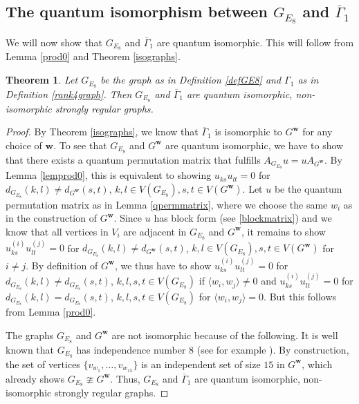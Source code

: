 \documentclass[11pt]{article}
\newtheorem{theo}{Theorem}[section]
\theoremstyle{definition}
\numberwithin{equation}{section}
\begin{document}
\subsection[The quantum isomorphism]{The quantum isomorphism between \texorpdfstring{$G_{E_8}$}{G E8} and \texorpdfstring{$\overline{\Gamma}_1$}{the complement of Gamma 1}}

We will now show that $G_{E_8}$ and $\overline{\Gamma}_1$ are quantum isomorphic. This will follow from Lemma \ref{prod0} and Theorem \ref{isographs}.

\begin{theo}\label{qisostronglyregular}
Let $G_{E_8}$ be the graph as in Definition \ref{defGE8} and $\Gamma_1$ as in Definition \ref{rank4graph}. Then $G_{E_8}$ and $\overline{\Gamma}_1$ are quantum isomorphic, non-isomorphic strongly regular graphs.  
\end{theo}

\begin{proof}
By Theorem \ref{isographs}, we know that $\overline{\Gamma}_1$ is isomorphic to $G^{\boldsymbol{w}}$ for any choice of $\boldsymbol{w}$. To see that $G_{E_8}$ and $G^{\boldsymbol{w}}$ are quantum isomorphic, we have to show that there exists a quantum permutation matrix that fulfills $A_{G_{E_8}}u=uA_{G^{\boldsymbol{w}}}$. By Lemma \ref{lemprod0}, this is equivalent to showing $u_{ks}u_{lt}=0$ for $d_{G_{E_8}}(k,l)\neq d_{G^{\boldsymbol{w}}}(s,t)$, $k,l \in V(G_{E_8}), s,t \in V(G^{\boldsymbol{w}})$. Let $u$ be the quantum permutation matrix as in Lemma \ref{qpermmatrix}, where we choose the same $w_i$ as in the construction of $G^{\boldsymbol{w}}$. Since $u$ has block form (see \eqref{blockmatrix}) and we know that all vertices in $V_i$ are adjacent in $G_{E_8}$ and $G^{\boldsymbol{w}}$, it remains to show $u_{ks}^{(i)}u_{lt}^{(j)}=0$ for $d_{G_{E_8}}(k,l)\neq d_{G^{\boldsymbol{w}}}(s,t)$, $k,l \in V(G_{E_8}), s,t \in V(G^{\boldsymbol{w}})$ for $i \neq j$. By definition of $G^{\boldsymbol{w}}$, we thus have to show $u_{ks}^{(i)}u_{lt}^{(j)}=0$ for $d_{G_{E_8}}(k,l)\neq d_{G_{E_8}}(s,t)$, $k,l,s,t \in V(G_{E_8})$ if $\langle w_i,w_j \rangle \neq0$ and $u_{ks}^{(i)}u_{lt}^{(j)}=0$ for $d_{G_{E_8}}(k,l)= d_{G_{E_8}}(s,t)$, $k,l,s,t \in V(G_{E_8})$  for $\langle w_i,w_j \rangle =0$. But this follows from Lemma \ref{prod0}. 

The graphs $G_{E_8}$ and $G^{\boldsymbol{w}}$ are not isomorphic because of the following. It is well known that $G_{E_8}$ has independence number $8$ (see for example \cite[Section 10.39]{BVM}). By construction, the set of vertices $\{v_{w_1}, \dots, v_{w_{15}}\}$ is an independent set of size $15$ in $G^{\boldsymbol{w}}$, which already shows $G_{E_8}\ncong G^{\boldsymbol{w}}$. 
Thus, $G_{E_8}$ and $\overline{\Gamma}_1$ are quantum isomorphic, non-isomorphic strongly regular graphs.
\end{proof}
\end{document}
